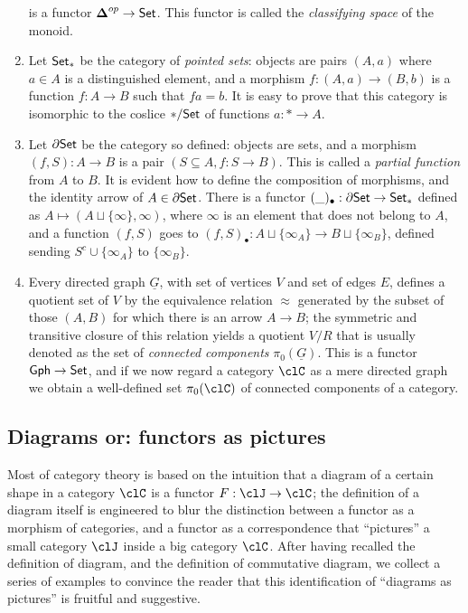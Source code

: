 \documentclass[11pt]{article}
\begin{document}
\begin{example}
\begin{enumerate}
		is a functor $\boldsymbol{\Delta}^{op} \to \mathsf{Set}$. This functor is called the \emph{classifying space} of the monoid.
		\item  Let $\mathsf{Set}_*$ be the category of \emph{pointed sets}: objects are pairs $(A,a)$ where $a\in A$ is a distinguished element, and a morphism $f : (A,a) \to (B,b)$ is a function $f :A\to B$ such that $fa=b$. It is easy to prove that this category is isomorphic to the coslice  $*/\mathsf{Set}$ of functions $a : * \to A$.
		\item  Let $\partial\mathsf{Set}$ be the category so defined: objects are sets, and a morphism $(f,S) : A \to B$ is  a pair $(S \subseteq A, f : S \to B)$. This is called a \emph{partial function} from $A$ to $B$. It is evident how to define the composition of morphisms, and the identity arrow of $A \in\partial\mathsf{Set}$. There is a functor $(\_)_\bullet : \partial\mathsf{Set} \to \mathsf{Set}_*$ defined as $A\mapsto (A\sqcup \{\infty\}, \infty)$, where $\infty$ is an element that does not belong to $A$, and a function $(f,S)$ goes to $(f,S)_\bullet : A\sqcup \{\infty_A\} \to B\sqcup\{\infty_B\}$, defined sending $S^c\cup \{\infty_A\}$ to $\{\infty_B\}$.
		\item  Every directed graph $\underline G$, with set of vertices $V$ and set of edges $E$, defines a quotient set of $V$ by the equivalence relation $\approx$ generated by the subset of those $(A, B)$ for which there is an arrow $A\to B$; the symmetric and transitive closure of this relation yields a quotient $V/R$ that is usually denoted as the set of \emph{connected components} $\pi_0(\underline G)$. This is a functor $\mathsf{Gph} \to \mathsf{Set}$, and if we now regard a category $\clC$ as a mere directed graph we obtain a well-defined set $\pi_0(\clC)$ of connected components of a category.
	\end{enumerate}
\end{example}

\subsection{Diagrams or: functors as pictures}
Most of category theory is based on the intuition that a diagram of a certain shape in a category $\clC$ is a functor $F : \clJ \to \clC$; the definition of a diagram itself is engineered to blur the distinction between a functor as a morphism of categories, and a functor as a correspondence that ``pictures'' a small category $\clJ$ inside a big category $\clC$. After having recalled the definition of diagram, and the definition of commutative diagram, we collect a series of examples to convince the reader that this identification of ``diagrams as pictures'' is fruitful and suggestive.
\end{document}
